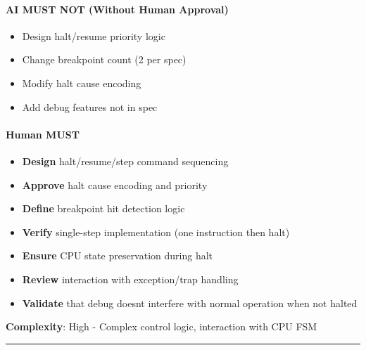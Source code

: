\paragraph{\texorpdfstring{\warn{} AI MUST NOT (Without Human
Approval)}{ AI MUST NOT (Without Human Approval)}}\label{cr:status:phase1-ai-human-responsibilities:warning-ai-must-not-without-human-approval-8}

\begin{record}

\begin{itemize}
\tightlist
\item
  Design halt/\allowbreak{}resume priority logic
\item
  Change breakpoint count (2 per spec)
\item
  Modify halt cause encoding
\item
  Add debug features not in spec
\end{itemize}

\end{record}

\paragraph{\texorpdfstring{\hold{} Human MUST}{ Human MUST}}\label{cr:status:phase1-ai-human-responsibilities:raised-hand-human-must-8}

\begin{record}

\begin{itemize}
\tightlist
\item
  \textbf{Design} halt/\allowbreak{}resume/\allowbreak{}step command
  sequencing
\item
  \textbf{Approve} halt cause encoding and priority
\item
  \textbf{Define} breakpoint hit detection logic
\item
  \textbf{Verify} single-step implementation (one instruction then halt)
\item
  \textbf{Ensure} CPU state preservation during halt
\item
  \textbf{Review} interaction with exception/\allowbreak{}trap handling
\item
  \textbf{Validate} that debug doesn\textquotesingle t interfere with
  normal operation when not halted
\end{itemize}

\textbf{Complexity}: \bad{} High - Complex control logic, interaction
with CPU FSM

\begin{center}\rule{0.5\linewidth}{0.5pt}\end{center}

\end{record}

